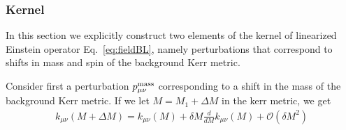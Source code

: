 \documentclass[aps,prd,amsmath,showpacs,amssymb,superscriptaddress,nofootinbib,longbibliography,eqsecnum,preprintnumbers]{revtex4-1}
\begin{document}


%

\subsubsection{Kernel}

In this section we explicitly construct two elements of the kernel of linearized Einstein operator Eq.~\eqref{eq:fieldBL}, namely perturbations that correspond to shifts in mass and spin of the background Kerr metric.

Consider first a perturbation $p_{\mu\nu}^{\rm mass}$ corresponding to a shift in the mass of the background Kerr metric. If we let $M=M_1+\Delta M$ in the kerr metric, we get
\begin{align}
k_{\mu \nu}(M+\Delta M)=k_{\mu \nu}(M)+\delta M\frac{d}{dM}k_{\mu\nu}(M) +\mathcal{O}(\delta M^2)
\end{align}
\end{document}
